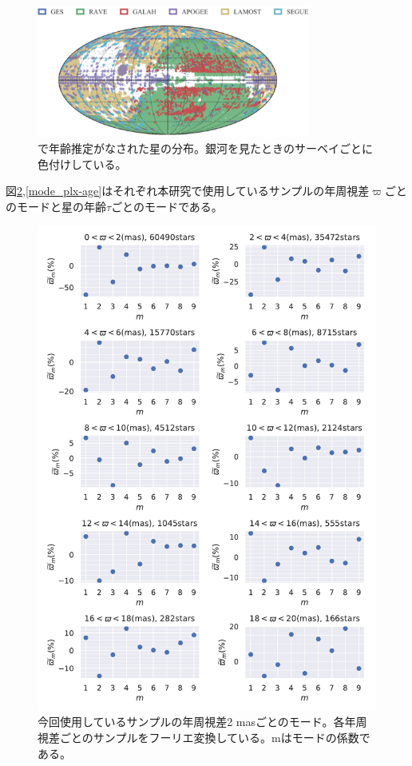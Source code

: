 \begin{figure}[htbp]
\begin{center}
	\includegraphics[width=9cm]{fig/SD18_fig1.pdf}
	\caption{\cite{SD18}で年齢推定がなされた星の分布。銀河を見たときのサーベイごとに色付けしている。}
	\label{fig2}
\end{center}
\end{figure}

図\ref{mode_plx},\ref{mode_plx-age}はそれぞれ本研究で使用しているサンプルの年周視差$\varpi$ごとのモードと星の年齢$\tau$ごとのモードである。

\begin{figure}[htbp]
\begin{center}
	\includegraphics[width=12cm]{fig/mode_plx.pdf}
	\caption{今回使用しているサンプルの年周視差2 masごとのモード。各年周視差ごとのサンプルをフーリエ変換している。mはモードの係数である。}
	\label{mode_plx}
\end{center}
\end{figure}

